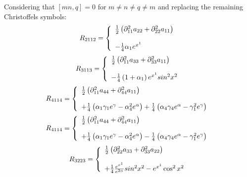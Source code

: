 Considering that $[mn,q]= 0$ for $m\ne n \ne q \ne m$ and replacing the remaining Christoffels symbols:
\begin{align}
R_{2112}&= \left\{\begin{array}{l}
\frac{1}{2}\left( \partial^2_{11} a_{22} + \partial^2_{22} a_{11} \right)\\\\
-\frac{1}{4}\alpha _1 e^{x^1} 
\end {array}\right.\\
\end{align}
\begin{align}
R_{3113}&= \left\{\begin{array}{l}
\frac{1}{2}\left( \partial^2_{11} a_{33} + \partial^2_{33} a_{11} \right)\\\\
 -\frac{1}{4}\left(1+\alpha _1 \right) e^{x^1}sin^2 x^2\\
\end {array}\right.\\
\end{align}
\begin{align}
R_{4114}&= \left\{\begin{array}{l}
\frac{1}{2}\left( \partial^2_{11} a_{44} + \partial^2_{44} a_{11} \right)\\\\
+ \frac{1}{4}\left( \alpha _1\gamma _1 e^{\gamma}   - \alpha_4^2 e^{\alpha}\right)
+\frac{1}{4}\left(  \alpha _4\gamma _4  e^{\alpha}   - \gamma _1^2 e^{\gamma} \right)
\end {array}\right.\\
\end{align}
\begin{align}
R_{4114}&= \left\{\begin{array}{l}
\frac{1}{2}\left( \partial^2_{11} a_{44} + \partial^2_{44} a_{11} \right)\\\\
+ \frac{1}{4}\left( \alpha _1  \gamma _1 e^{\gamma}-\alpha _4 ^2  e^{\alpha}    \right)
-\frac{1}{4}\left(\alpha _4\gamma _4 e^{\alpha}- \gamma _1^2 e^{\gamma}   \right)
\end {array}\right.\\
\end{align}
\begin{align}
R_{3223}&= \left\{\begin{array}{l}
\frac{1}{2}\left( \partial^2_{22} a_{33} + \partial^2_{33} a_{22} \right)\\\\
+ \frac{1}{4}\frac{e^{x^1}}{e^{2\alpha}}   sin^2 x^2 - e^{x^1} \cos^2x^2 
\end {array}\right.\\
\end{align}

